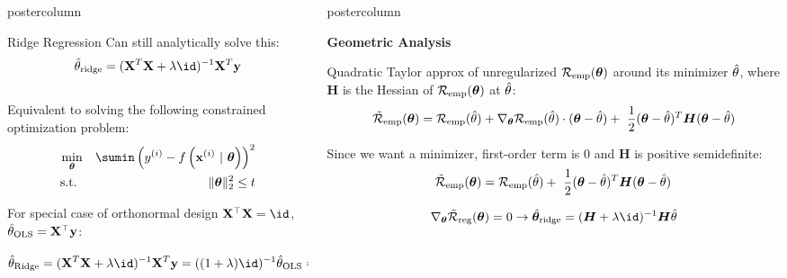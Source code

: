 \documentclass{beamer}
\newlength{\columnheight} %
\begin{document}
\begin{frame}[fragile]{}
\begin{columns}
\begin{column}{.31\textwidth}
\begin{beamercolorbox}[center]{postercolumn}
\begin{minipage}{.98\textwidth}
{\begin{myblock}{Ridge Regression}
Can still analytically solve this:
$$\thetah_{\text{ridge}} = ({\Xmat}^T \Xmat  + \lambda \id)^{-1} \Xmat^T\yv$$\\

Equivalent to solving the following constrained optimization problem:
\begin{eqnarray*}
\min_{\thetav} && \sumin \left(\yi - \fxit\right)^2 \\
  \text{s.t. } && \|\thetav\|_2^2  \leq t \\
\end{eqnarray*}

For special case of orthonormal design $\Xmat^{\top}\Xmat=\id$, $\hat{\theta}_{\text{OLS}}=\mathbf{X}^{\top}\mathbf{y}$:
$$\thetah_{\text{Ridge}}= ({\Xmat}^T \Xmat  + \lambda \id)^{-1} \Xmat^T\yv=((1+\lambda)\id)^{-1}\thetah_{\text{OLS}} = \frac{\thetah_{\text{OLS}}}{1+\lambda}\quad (\text{no sparsity})\vspace{-0.22cm}$$

\end{myblock}
				}
			\end{minipage}
		\end{beamercolorbox}
	\end{column}
	

\begin{column}{.31\textwidth}
\begin{beamercolorbox}[center]{postercolumn}
\begin{minipage}{.98\textwidth}
\parbox[t][\columnheight]{\textwidth}{
\begin{myblock}{}

\begin{codebox}
\textbf{Geometric Analysis}
\end{codebox}
Quadratic Taylor approx of unregularized $\mathcal{R}_{\text{emp}}(\bm{\theta})$ around its minimizer $\hat{\theta}$, where $\bm{H}$ is the Hessian of $\mathcal{R}_{\text{emp}}(\bm{\theta})$ at $\hat{\theta}$:
$$ \mathcal{\tilde R}_{\text{emp}}(\thetav)= \mathcal{R}_{\text{emp}}(\thetah) + \nabla_{\thetav} \mathcal{R}_{\text{emp}}(\thetah)\cdot(\thetav - \thetah) + \ \frac{1}{2} (\thetav - \thetah)^T \bm{H} (\thetav - \thetah) $$

Since we want a minimizer, first-order term is 0 and $\bm{H}$ is positive semidefinite:
$$ \mathcal{\tilde R}_{\text{emp}}(\thetav)= \mathcal{R}_{\text{emp}}(\thetah) + \ \frac{1}{2} (\thetav - \thetah)^T \bm{H} (\thetav - \thetah) $$

$$\nabla_{\thetav}\mathcal{\tilde R}_{\text{reg}}(\thetav) = 0 \rightarrow \hat{\thetav}_{\text{ridge}} = (\bm{H} + \lambda \id)^{-1}\bm{H} \thetah$$


\end{myblock}}
\end{minipage}
\end{beamercolorbox}
\end{column}
\end{columns}
\end{frame}
\end{document}
